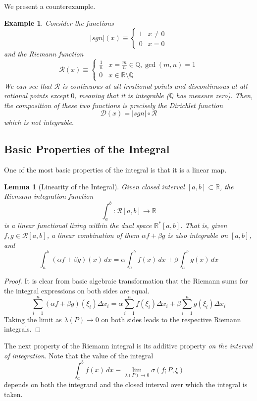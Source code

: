 \documentclass{article}
\newtheorem{lemma}[theorem]{Lemma}
\newtheorem{example}{Example}[section]
\theoremstyle{remark}
\theoremstyle{definition}
\begin{document}
We present a counterexample. 
\begin{example}
Consider the functions
\[|sgn|(x) \equiv \begin{cases}
1 & x \neq 0 \\
0 & x = 0
\end{cases}\]
and the Riemann function 
\[\mathcal{R}(x) \equiv \begin{cases}
\frac{1}{n} & x = \frac{m}{n} \in \mathbb{Q}, \gcd(m, n) = 1 \\
0 & x \in \mathbb{R} \setminus \mathbb{Q}
\end{cases}\]
We can see that $\mathcal{R}$ is continuous at all irrational points and discontinuous at all rational points except $0$, meaning that it is integrable ($\mathbb{Q}$ has measure zero). Then, the composition of these two functions is precisely the Dirichlet function
\[\mathcal{D}(x) = |sgn| \circ \mathcal{R}\]
which is not integrable. 
\end{example}

\subsection{Basic Properties of the Integral}

One of the most basic properties of the integral is that it is a linear map. 
\begin{lemma}[Linearity of the Integral]
Given closed interval $[a, b] \subset \mathbb{R}$, the Riemann integration function 
\[\int_a^b: \mathcal{R}[a, b] \longrightarrow \mathbb{R}\]
is a linear functional living within the dual space $\mathbb{R}^* [a, b]$. That is, given $f, g \in \mathcal{R}[a, b]$, a linear combination of them $\alpha f + \beta g$ is also integrable on $[a,b]$, and 
\[\int_a^b (\alpha f + \beta g)(x)\,dx = \alpha \int_a^b f(x)\,dx + \beta \int_a^b g(x)\,dx\]
\end{lemma}
\begin{proof}
It is clear from basic algebraic transformation that the Riemann sums for the integral expressions on both sides are equal. 
\[\sum_{i=1}^n (\alpha f + \beta g) (\xi_i) \Delta x_i = \alpha \sum_{i=1}^n f(\xi_i) \Delta x_i + \beta \sum_{i=1}^n g(\xi_i) \Delta x_i\]
Taking the limit as $\lambda(P) \rightarrow 0$ on both sides leads to the respective Riemann integrals. 
\end{proof}


The next property of the Riemann integral is its additive property \textit{on the interval of integration}. Note that the value of the integral 
\[\int_a^b f(x) \,dx \equiv \lim_{\lambda(P) \rightarrow 0} \sigma(f; P, \xi)\]
depends on both the integrand and the closed interval over which the integral is taken. 
\end{document}
